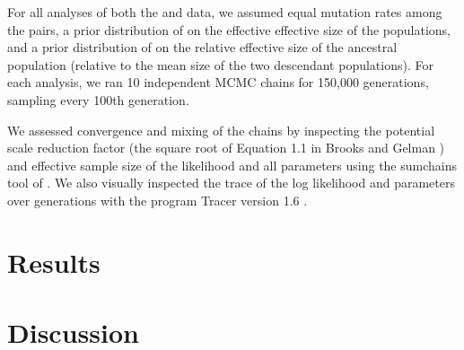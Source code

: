 For all analyses of both the  and  data, we
assumed equal mutation rates among the pairs, a prior distribution of
 on the effective effective size of the populations, and a
prior distribution of  on the relative effective size of the
ancestral population (relative to the mean size of the two descendant
populations).
For each analysis, we ran 10 independent MCMC chains for 150,000 generations,
sampling every 100th generation.

We assessed convergence and mixing of the chains by inspecting the potential scale
reduction factor (the square root of Equation 1.1 in Brooks and Gelman
\citeyear{Brooks1998}) and effective sample size \citep{Gong2014} of the
likelihood and all parameters using the sumchains tool of \pycoevolity.
We also visually inspected the trace of the log likelihood and parameters over
generations with the program Tracer version 1.6 \citep{Tracer16}.


\section{Results}

\section{Discussion}
